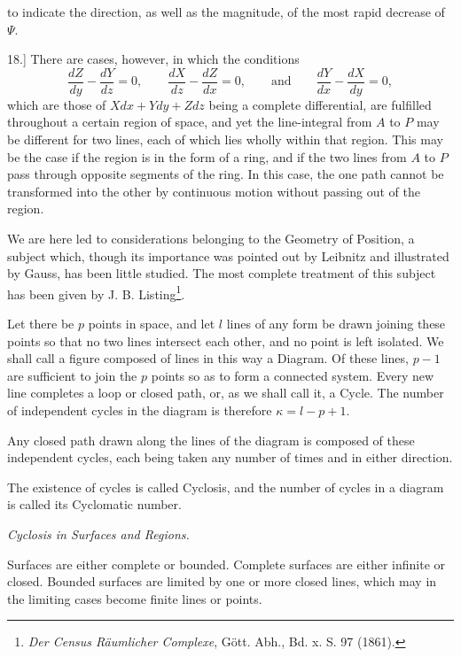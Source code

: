 \documentclass[11pt,a4paper]{article}
\begin{document}
\clearpage
\setcounter{footnote}{0}

to indicate the direction, as well as the magnitude, of the most rapid
decrease of \(\Psi\).

18.] There are cases, however, in which the conditions
\[
\frac{dZ}{dy}-\frac{dY}{dz}=0,\qquad
\frac{dX}{dz}-\frac{dZ}{dx}=0,\qquad \text{and}\qquad
\frac{dY}{dx}-\frac{dX}{dy}=0,
\]
which are those of \(Xdx+Ydy+Zdz\) being a complete differential, are
fulfilled throughout a certain region of space, and yet the
line-integral from \(A\) to \(P\) may be different for two lines, each
of which lies wholly within that region. This may be the case if the
region is in the form of a ring, and if the two lines from \(A\) to
\(P\) pass through opposite segments of the ring. In this case, the one
path cannot be transformed into the other by continuous motion without
passing out of the region.

We are here led to considerations belonging to the Geometry of Position,
a subject which, though its importance was pointed out by Leibnitz and
illustrated by Gauss, has been little studied. The most complete
treatment of this subject has been given by J. B. Listing\footnote{
\textit{Der Census Räumlicher Complexe}, Gött. Abh., Bd. x. S. 97
(1861).}.

Let there be \(p\) points in space, and let \(l\) lines of any form be
drawn joining these points so that no two lines intersect each other,
and no point is left isolated. We shall call a figure composed of lines
in this way a Diagram. Of these lines, \(p-1\) are sufficient to join
the \(p\) points so as to form a connected system. Every new line
completes a loop or closed path, or, as we shall call it, a Cycle. The
number of independent cycles in the diagram is therefore
\(\kappa=l-p+1\).

Any closed path drawn along the lines of the diagram is composed of
these independent cycles, each being taken any number of times and in
either direction.

The existence of cycles is called Cyclosis, and the number of cycles in
a diagram is called its Cyclomatic number.

\begin{center}
\textit{Cyclosis in Surfaces and Regions.}
\end{center}

Surfaces are either complete or bounded. Complete surfaces are either
infinite or closed. Bounded surfaces are limited by one or more closed
lines, which may in the limiting cases become finite lines or points.
\end{document}
